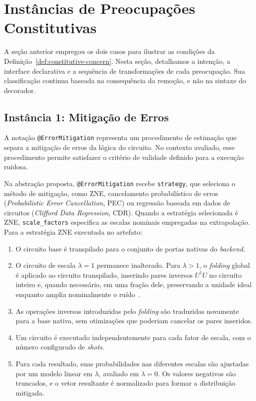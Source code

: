 \documentclass[sigconf]{acmart}
\begin{document}
\section{Instâncias de Preocupações Constitutivas}
\label{sec:catalog}

A seção anterior empregou os dois casos para ilustrar as condições da Definição~\ref{def:constitutive-concern}. Nesta seção, detalhamos a intenção, a interface declarativa e a sequência de transformações de cada preocupação. Sua classificação continua baseada na consequência da remoção, e não na sintaxe do decorador.

\subsection{Instância 1: Mitigação de Erros}

A notação \texttt{@ErrorMitigation} representa um procedimento de estimação que separa a mitigação de erros da lógica do circuito. No contexto avaliado, esse procedimento permite satisfazer o critério de validade definido para a execução ruidosa.

Na abstração proposta, \texttt{@ErrorMitigation} recebe \texttt{strategy}, que seleciona o método de mitigação, como ZNE, cancelamento probabilístico de erros (\textit{Probabilistic Error Cancellation}, PEC) ou regressão baseada em dados de circuitos (\textit{Clifford Data Regression}, CDR). Quando a estratégia selecionada é ZNE, \texttt{scale\_factors} especifica as escalas nominais empregadas na extrapolação. Para a estratégia ZNE executada no artefato:

\begin{enumerate}
  \item O circuito base é transpilado para o conjunto de portas nativas do \textit{backend}.
  \item O circuito de escala $\lambda=1$ permanece inalterado. Para $\lambda>1$, o \textit{folding} global é aplicado ao circuito transpilado, inserindo pares inversos $U^\dagger U$ no circuito inteiro e, quando necessário, em uma fração dele, preservando a unidade ideal enquanto amplia nominalmente o ruído~\cite{giurgica2020}.
  \item As operações inversas introduzidas pelo \textit{folding} são traduzidas novamente para a base nativa, sem otimizações que poderiam cancelar os pares inseridos.
  \item Um circuito é executado independentemente para cada fator de escala, com o número configurado de \textit{shots}.
  \item Para cada resultado, suas probabilidades nas diferentes escalas são ajustadas por um modelo linear em $\lambda$, avaliado em $\lambda=0$. Os valores negativos são truncados, e o vetor resultante é normalizado para formar a distribuição mitigada.
\end{enumerate}
\end{document}
